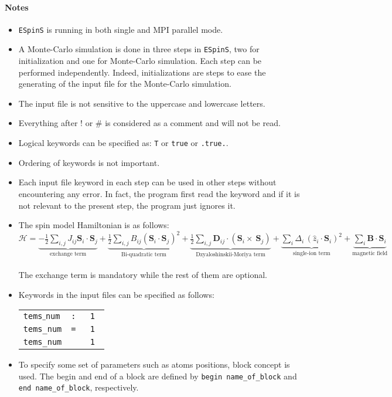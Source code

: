 \documentclass[10pt]{report}
\begin{document}
\paragraph{Notes}
\begin{itemize} %
\item {\tt ESpinS} is running in both single and MPI parallel mode. 
\item A Monte-Carlo simulation is done in three steps in {\tt ESpinS}, 
two for initialization and one for Monte-Carlo simulation.
 Each step can be performed independently. Indeed, initializations are steps to ease the generating of the input file for the Monte-Carlo simulation.
\item The input file is not sensitive to the uppercase and lowercase letters.
\item Everything after $!$ or $\#$ is considered as a comment and will not be read.
\item Logical keywords can be specified as: {\tt T} or {\tt true} or {\tt .true.}.
\item Ordering of keywords is not important.
\item  Each input file keyword in each step can be used in other steps without encountering any error. 
       In fact, the program first read the keyword and if it is not relevant to the present step, the program just ignores it.
\item The spin model Hamiltonian is as follows: \\
$\mathcal{H}=
\underbrace{-\frac{1}{2}\sum_{i,j}J_{ij}{\mathbf{S}_i\cdot\mathbf{S}_j}}_\text{exchange term}+
\underbrace{\frac{1}{2}\sum_{i,j}B_{ij}({\mathbf{S}_i\cdot\mathbf{S}_j})^2}_\text{Bi-quadratic term}+
\underbrace{\frac{1}{2}\sum_{i,j}\mathbf{D}_{ij}\cdot(\mathbf{S}_i\times~\mathbf{S}_j)}_\text{Dzyaloshinskii-Moriya term}+
\underbrace{\sum_{i}\Delta_i\,(\hat{z}_i\cdot\mathbf{S}_i)^2}_\text{single-ion term}+
\underbrace{\sum_{i}\mathbf{B}\cdot\mathbf{S}_i}_\text{magnetic field}$
\\
\\The exchange term is mandatory while the rest of them are optional.
\item Keywords in the input files can be specified as follows:\\
\begin{tabular}{lll}
    {\tt tems$\_$num} &\tt :&\tt 1 \\
    {\tt  tems\_num} &\tt = &\tt 1 \\
    {\tt tems\_num} & &\tt 1
\end{tabular}
\item To specify some set of parameters such as atoms positions, block concept is used. 
      The begin and end of a block are defined by {\tt begin name\_of\_block} and {\tt end name\_of\_block}, respectively.
\end{itemize}
\end{document}
